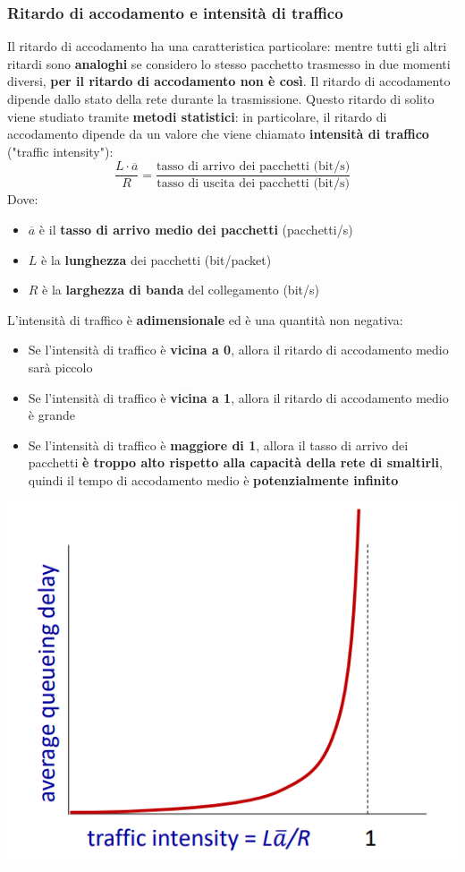\documentclass[12pt]{article}
\begin{document}
\subsubsection{Ritardo di accodamento e intensità di traffico}
Il ritardo di accodamento ha una caratteristica particolare: mentre tutti gli altri ritardi sono \textbf{analoghi} se considero lo stesso pacchetto trasmesso in due momenti diversi, \textbf{per il ritardo di accodamento non è così}.
Il ritardo di accodamento dipende dallo stato della rete durante la trasmissione. Questo ritardo di solito viene studiato tramite \textbf{metodi statistici}: in particolare, il ritardo di accodamento dipende da un valore che viene chiamato \textbf{intensità di traffico} ("traffic intensity"):
$$\frac{L \cdot \overline{a}}{R} = \frac{\textrm{tasso di arrivo dei pacchetti (bit/s)}}{\textrm{tasso di uscita dei pacchetti (bit/s)}}$$
Dove:
\begin{itemize}
    \item $\overline{a}$ è il \textbf{tasso di arrivo medio dei pacchetti} (pacchetti/s)
    \item $L$ è la \textbf{lunghezza} dei pacchetti (bit/packet)
    \item $R$ è la \textbf{larghezza di banda} del collegamento (bit/s)
\end{itemize}
L'intensità di traffico è \textbf{adimensionale} ed è una quantità non negativa:
\begin{itemize}
    \item Se l'intensità di traffico è \textbf{vicina a 0}, allora il ritardo di accodamento medio sarà piccolo
    \item Se l'intensità di traffico è \textbf{vicina a 1}, allora il ritardo di accodamento medio è grande
    \item Se l'intensità di traffico è \textbf{maggiore di 1}, allora il tasso di arrivo dei pacchetti \textbf{è troppo alto rispetto alla capacità della rete di smaltirli}, quindi il tempo di accodamento medio è \textbf{potenzialmente infinito}
\end{itemize}
\begin{center}
    \includegraphics[width =0.50\linewidth]{Images/20.PNG}
\end{center}
\end{document}
